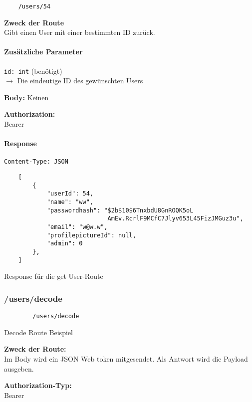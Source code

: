 \begin{lstlisting}
    /users/54
\end{lstlisting}

\textbf{Zweck der Route} \\
Gibt einen User mit einer bestimmten ID zurück.



\paragraph{Zusätzliche Parameter}
\lstinline{id: int} (benötigt) \\
$\rightarrow$ Die eindeutige ID des gewünschten Users

\textbf{Body:}
Keinen

\textbf{Authorization:} \\
Bearer

\paragraph{Response }

\begin{code}
    \lstinline{Content-Type: JSON}
    \begin{lstlisting}
    [
        {
            "userId": 54,
            "name": "ww",
            "passwordhash": "$2b$10$6TnxbdU8GnROQK5oL
                             AmEv.RcrlF9MCfC7Jlyv653L45FizJMGuz3u",
            "email": "w@w.w",
            "profilepictureId": null,
            "admin": 0
        },
    ]
    \end{lstlisting}
    \caption{Response für die get User-Route}
\end{code}

\pagebreak

\subsubsection{/users/decode}

\begin{code}
    \begin{lstlisting}
        /users/decode
    \end{lstlisting}
    \caption{Decode Route Beispiel}
\end{code}

\textbf{Zweck der Route:} \\
Im Body wird ein JSON Web token mitgesendet. Als Antwort
wird die Payload ausgeben.

\textbf{Authorization-Typ:} \\
Bearer


